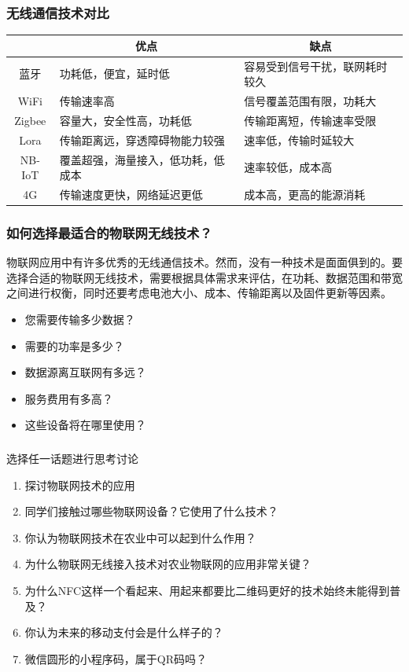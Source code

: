 \begin{frame}
    \frametitle{无线通信技术对比}
\begin{table}[]
    \begin{tabular}{@{}cll@{}}
    \toprule
           & \multicolumn{1}{c}{优点} & \multicolumn{1}{c}{缺点} \\ \midrule
    蓝牙     & 功耗低，便宜，延时低             & 容易受到信号干扰，联网耗时较久        \\
    WiFi   & 传输速率高                  & 信号覆盖范围有限，功耗大           \\
    Zigbee & 容量大，安全性高，功耗低           & 传输距离短，传输速率受限           \\
    Lora   & 传输距离远，穿透障碍物能力较强        & 速率低，传输时延较大             \\
    NB-IoT & 覆盖超强，海量接入，低功耗，低成本      & 速率较低，成本高               \\
    4G     & 传输速度更快，网络延迟更低          & 成本高，更高的能源消耗            \\ \bottomrule
    \end{tabular}
    \end{table}
\end{frame}

\begin{frame}
    \frametitle{如何选择最适合的物联网无线技术？}
    物联网应用中有许多优秀的无线通信技术。然而，没有一种技术是面面俱到的。要选择合适的物联网无线技术，需要根据具体需求来评估，在功耗、数据范围和带宽之间进行权衡，同时还要考虑电池大小、成本、传输距离以及固件更新等因素。
    \begin{itemize}
      \item 您需要传输多少数据？
      \item 需要的功率是多少？
      \item 数据源离互联网有多远？
      \item 服务费用有多高？
      \item 这些设备将在哪里使用？
    \end{itemize}
\end{frame}


\begin{frame}[t]
    \frametitle{}
    \begin{block}{选择任一话题进行思考讨论}
        \begin{enumerate}
          \item 探讨物联网技术的应用
          \item 同学们接触过哪些物联网设备？它使用了什么技术？
          \item 你认为物联网技术在农业中可以起到什么作用？
          \item 为什么物联网无线接入技术对农业物联网的应用非常关键？
          \item 为什么NFC这样一个看起来、用起来都要比二维码更好的技术始终未能得到普及？
          \item 你认为未来的移动支付会是什么样子的？
          \item 微信圆形的小程序码，属于QR码吗？
        \end{enumerate}
    \end{block}
\end{frame}
